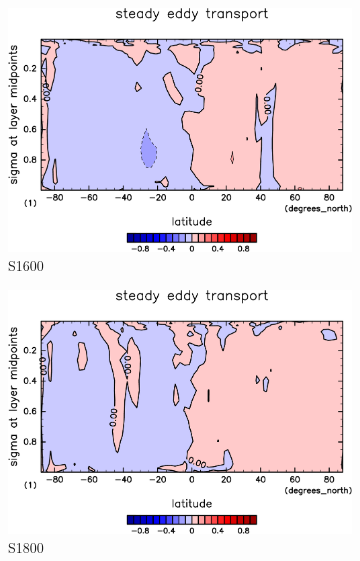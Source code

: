 \documentclass[body]{subfiles}
\begin{document}
\begin{figure}[t]
\begin{subfigure}{.4\textwidth}
		\includegraphics[width=\textwidth]{S1600/MeriHeatTransTest@latentEn_SE,time=3650:4015-crop-rotate.pdf}
		\caption{S1600}\label{潜熱停滞性擾乱S1600}
	\end{subfigure}
	\begin{subfigure}{.4\textwidth}
		\centering
		\includegraphics[width=\textwidth]{S1800/MeriHeatTransTest@latentEn_SE,time=3650:4015-crop-rotate.pdf}
		\caption{S1800}\label{潜熱停滞性擾乱S1800}
	\end{subfigure}
	\begin{subfigure}{.4\textwidth}
		\centering

\end{subfigure}
\end{figure}
\end{document}
